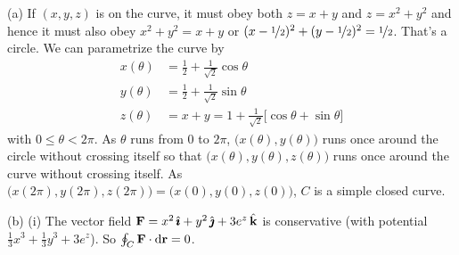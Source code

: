 \begin{solution} (a)
If $(x,y,z)$ is on the curve, it must obey both $z=x+y$
and $z=x^2+y^2$ and hence it must also obey $x^2+y^2=x+y$
or $(x-\nicefrac{1}{2})^2 + (y-\nicefrac{1}{2})^2 = \nicefrac{1}{2}$.
That's a circle. We can parametrize the curve by
\begin{align*}
x(\theta)&= \frac{1}{2} +\frac{1}{\sqrt{2}}\cos\theta \\
y(\theta)&= \frac{1}{2} +\frac{1}{\sqrt{2}}\sin\theta \\
z(\theta)&= x+y = 1+ \frac{1}{\sqrt{2}}\big[\cos\theta+\sin\theta\big] 
\end{align*}
with $0\le\theta<2\pi$. As $\theta$ runs from $0$ to $2\pi$,
$\big(x(\theta),y(\theta)\big)$ runs once around the circle without
crossing itself so that  $\big(x(\theta),y(\theta),z(\theta)\big)$ runs 
once around the curve without crossing itself. As 
$\big(x(2\pi),y(2\pi),z(2\pi)\big)=\big(x(0),y(0),z(0)\big)$, 
$C$ is a simple closed curve. 

\noindent (b) (i) The vector field $\mathbf{F}= x^2\,\hat{\pmb{\imath}} + y^2\,\hat{\pmb{\jmath}} + 3 e^z\,\hat{\mathbf{k}}$
is conservative (with potential $\frac{1}{3}x^3 +\frac{1}{3}y^3 + 3e^z$).
So $\oint_C\mathbf{F}\cdot\mathrm{d}\mathbf{r}=0$.



\end{solution}
